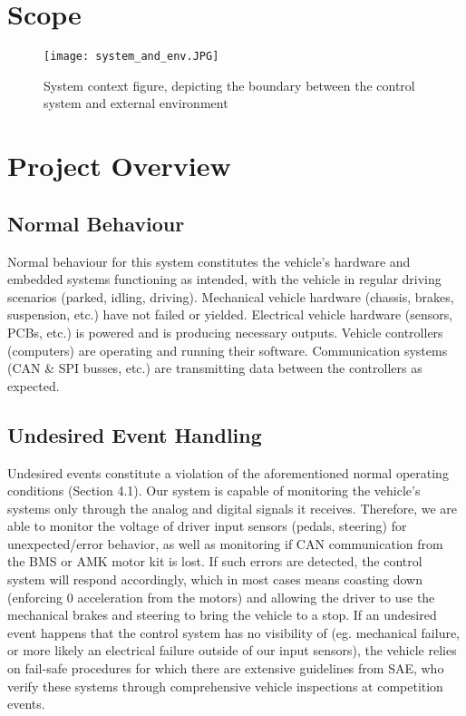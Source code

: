 \documentclass[12pt, titlepage]{article}
\begin{document}
\section{Scope}
\begin{figure}[h!]
    \texttt{[image: system\_and\_env.JPG]}
    \centering
    \caption{System context figure, depicting the boundary between the control system and external environment}
\end{figure}

\section{Project Overview}

\subsection{Normal Behaviour}

Normal behaviour for this system constitutes the vehicle's hardware and embedded systems functioning as intended, 
with the vehicle in regular driving scenarios (parked, idling, driving). Mechanical vehicle hardware (chassis, 
brakes, suspension, etc.) have not failed or yielded. Electrical vehicle hardware (sensors, PCBs, etc.) is powered 
and is producing necessary outputs. Vehicle controllers (computers) are operating and running their software. 
Communication systems (CAN & SPI busses, etc.) are transmitting data between the controllers as expected. 


\subsection{Undesired Event Handling}

Undesired events constitute a violation of the aforementioned normal operating conditions (Section 4.1). Our system is capable of monitoring the vehicle's systems only through the analog and digital signals it receives. Therefore, we are able to monitor the voltage of driver input sensors (pedals, steering) for unexpected/error behavior, as well as monitoring if CAN communication from the BMS or AMK motor kit is lost. If such errors are detected, the control system will respond accordingly, which in most cases means coasting down (enforcing 0 acceleration from the motors) and allowing the driver to use the mechanical brakes and steering to bring the vehicle to a stop. If an undesired event happens that the control system has no visibility of (eg. mechanical failure, or more likely an electrical failure outside of our input sensors), the vehicle relies on fail-safe procedures for which there are extensive guidelines from SAE, who verify these systems through comprehensive vehicle inspections at competition events.
\end{document}
